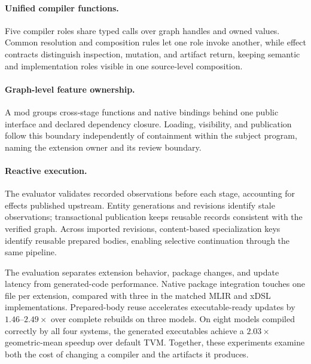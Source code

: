 \paragraph{Unified compiler functions.} Five compiler roles share typed calls over
graph handles and owned values. Common resolution and composition rules let
one role invoke another, while effect contracts distinguish inspection,
mutation, and artifact return, keeping semantic and implementation roles visible
in one source-level composition.

\paragraph{Graph-level feature ownership.} A mod groups cross-stage functions and
native bindings behind one public interface and declared dependency closure.
Loading, visibility, and publication follow this boundary independently of
containment within the subject program, naming the extension owner and its
review boundary.

\paragraph{Reactive execution.} The evaluator validates recorded observations
before each stage, accounting for effects published upstream. Entity generations
and revisions identify stale observations; transactional publication keeps
reusable records consistent with the verified graph. Across imported revisions,
content-based specialization keys identify reusable prepared bodies, enabling
selective continuation through the same pipeline.

The evaluation separates extension behavior, package changes, and update
latency from generated-code performance. Native package integration touches
one file per extension, compared with three in the matched MLIR and xDSL
implementations. Prepared-body reuse accelerates executable-ready updates by
$1.46$--$2.49\times$ over complete rebuilds on three models. On eight models
compiled correctly by all four systems, the generated executables achieve a
$2.03\times$ geometric-mean speedup over default TVM. Together, these
experiments examine both the cost of changing a compiler and the artifacts
it produces.
